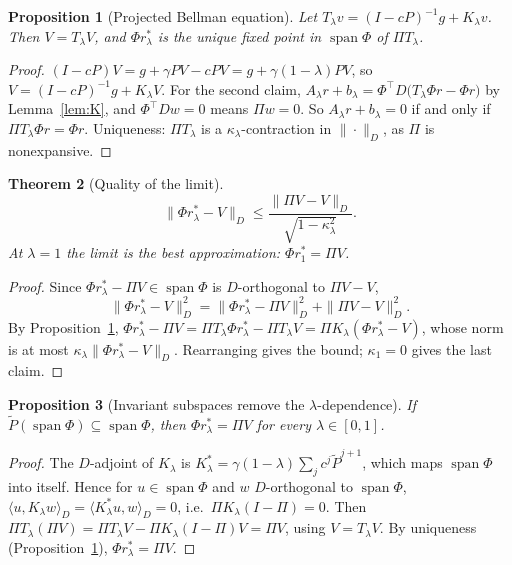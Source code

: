 \documentclass[11pt]{article}
\newtheorem{theorem}{Theorem}[section]
\newtheorem{proposition}[theorem]{Proposition}
\theoremstyle{definition}
\theoremstyle{remark}
\newcommand{\inner}[2]{\langle #1, #2\rangle}
\DeclareMathOperator{\spn}{span}
\begin{document}
\begin{proposition}[Projected Bellman equation]\label{prop:projected}
Let $T_\lambda v = (I - cP)^{-1} g + K_\lambda v$. Then $V = T_\lambda V$, and
$\Phi r^*_\lambda$ is the unique fixed point in $\spn\Phi$ of $\Pi T_\lambda$.
\end{proposition}
\begin{proof}
$(I - cP)V = g + \gamma P V - cPV = g + \gamma(1-\lambda)PV$, so
$V = (I-cP)^{-1}g + K_\lambda V$. For the second claim,
$A_\lambda r + b_\lambda = \Phi^\top D\big(T_\lambda \Phi r - \Phi r\big)$ by
Lemma~\ref{lem:K}, and $\Phi^\top D w = 0$ means $\Pi w = 0$. So $A_\lambda r + b_\lambda = 0$
if and only if $\Pi T_\lambda\Phi r = \Phi r$. Uniqueness: $\Pi T_\lambda$ is a
$\kappa_\lambda$-contraction in $\|\cdot\|_D$, as $\Pi$ is nonexpansive.
\end{proof}

\begin{theorem}[Quality of the limit]\label{thm:bias}
\[
  \|\Phi r^*_\lambda - V\|_D \le \frac{\|\Pi V - V\|_D}{\sqrt{1-\kappa_\lambda^2}}.
\]
At $\lambda = 1$ the limit is the best approximation: $\Phi r^*_1 = \Pi V$.
\end{theorem}
\begin{proof}
Since $\Phi r^*_\lambda - \Pi V \in \spn\Phi$ is $D$-orthogonal to $\Pi V - V$,
\[
  \|\Phi r^*_\lambda - V\|_D^2 = \|\Phi r^*_\lambda - \Pi V\|_D^2 + \|\Pi V - V\|_D^2 .
\]
By Proposition~\ref{prop:projected},
$\Phi r^*_\lambda - \Pi V = \Pi T_\lambda\Phi r^*_\lambda - \Pi T_\lambda V
= \Pi K_\lambda(\Phi r^*_\lambda - V)$, whose norm is at most
$\kappa_\lambda\|\Phi r^*_\lambda - V\|_D$. Rearranging gives the bound; $\kappa_1 = 0$
gives the last claim.
\end{proof}

\begin{proposition}[Invariant subspaces remove the $\lambda$-dependence]\label{prop:invariant}
If $\tilde P(\spn\Phi) \subseteq \spn\Phi$, then $\Phi r^*_\lambda = \Pi V$ for every
$\lambda \in [0,1]$.
\end{proposition}
\begin{proof}
The $D$-adjoint of $K_\lambda$ is
$K_\lambda^* = \gamma(1-\lambda)\sum_j c^j\tilde P^{j+1}$, which maps $\spn\Phi$ into
itself. Hence for $u \in \spn\Phi$ and $w$ $D$-orthogonal to $\spn\Phi$,
$\inner{u}{K_\lambda w}_D = \inner{K^*_\lambda u}{w}_D = 0$, i.e.\ $\Pi K_\lambda(I-\Pi) = 0$.
Then
$\Pi T_\lambda(\Pi V) = \Pi T_\lambda V - \Pi K_\lambda(I-\Pi)V = \Pi V$, using
$V = T_\lambda V$. By uniqueness (Proposition~\ref{prop:projected}),
$\Phi r^*_\lambda = \Pi V$.
\end{proof}
\end{document}
